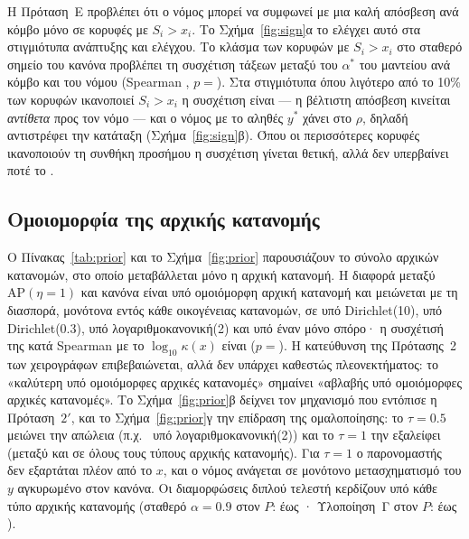 \documentclass[11pt,a4paper]{article}
\theoremstyle{definition}
\theoremstyle{plain}
\newcommand{\AP}{\mathrm{AP}}
\begin{document}
Η Πρόταση~E προβλέπει ότι ο νόμος μπορεί να συμφωνεί με μια καλή απόσβεση ανά κόμβο μόνο σε κορυφές με $S_i>x_i$. Το Σχήμα~\ref{fig:sign}α το ελέγχει αυτό στα \SignN{} στιγμιότυπα ανάπτυξης και ελέγχου. Το κλάσμα των κορυφών με $S_i>x_i$ στο σταθερό σημείο του κανόνα προβλέπει τη συσχέτιση τάξεων μεταξύ του $\alpha^*$ του μαντείου ανά κόμβο και του νόμου (Spearman \SignSpearman, $p={}$\SignSpearmanP{}). Στα \SignLowN{} στιγμιότυπα όπου λιγότερο από το 10\% των κορυφών ικανοποιεί $S_i>x_i$ η συσχέτιση είναι \SignLowCorr{} --- η βέλτιστη απόσβεση κινείται \emph{αντίθετα} προς τον νόμο --- και ο νόμος με το αληθές $y^*$ χάνει \SignLowDrop{} στο $\rho$, δηλαδή αντιστρέφει την κατάταξη (Σχήμα~\ref{fig:sign}β). Όπου οι περισσότερες κορυφές ικανοποιούν τη συνθήκη προσήμου η συσχέτιση γίνεται θετική, αλλά δεν υπερβαίνει ποτέ το \SignMaxCorr.

\subsection{Ομοιομορφία της αρχικής κατανομής}\label{sec:prior}

Ο Πίνακας~\ref{tab:prior} και το Σχήμα~\ref{fig:prior} παρουσιάζουν το σύνολο αρχικών κατανομών, στο οποίο μεταβάλλεται μόνο η αρχική κατανομή. Η διαφορά μεταξύ $\AP(\eta=1)$ και κανόνα είναι \PriorAPUnif{} υπό ομοιόμορφη αρχική κατανομή και μειώνεται με τη διασπορά, μονότονα εντός κάθε οικογένειας κατανομών, σε \PriorAPDirTen{} υπό Dirichlet(10), \PriorAPDirSmall{} υπό Dirichlet(0.3), \PriorAPLognTwo{} υπό λογαριθμοκανονική(2) και \PriorAPSeedOne{} υπό έναν μόνο σπόρο· η συσχέτισή της κατά Spearman με το $\log_{10}\kappa(x)$ είναι \PriorSpearman{} ($p={}$\PriorSpearmanP{}). Η κατεύθυνση της Πρότασης~2 των χειρογράφων επιβεβαιώνεται, αλλά δεν υπάρχει καθεστώς πλεονεκτήματος: το «καλύτερη υπό ομοιόμορφες αρχικές κατανομές» σημαίνει «αβλαβής υπό ομοιόμορφες αρχικές κατανομές». Το Σχήμα~\ref{fig:prior}β δείχνει τον μηχανισμό που εντόπισε η Πρόταση~$2'$, και το Σχήμα~\ref{fig:prior}γ την επίδραση της ομαλοποίησης: το $\tau=0.5$ μειώνει την απώλεια (π.χ.\ \PriorTauHalfLognTwo{} υπό λογαριθμοκανονική(2)) και το $\tau=1$ την εξαλείφει (μεταξύ \PriorTauOneMin{} και \PriorTauOneMax{} σε όλους τους τύπους αρχικής κατανομής). Για $\tau=1$ ο παρονομαστής δεν εξαρτάται πλέον από το $x$, και ο νόμος ανάγεται σε μονότονο μετασχηματισμό του $y$ αγκυρωμένο στον κανόνα. Οι διαμορφώσεις διπλού τελεστή κερδίζουν υπό κάθε τύπο αρχικής κατανομής (σταθερό $\alpha=0.9$ στον $P$: \PriorLinMin{} έως \PriorLinMax· Υλοποίηση~Γ στον $P$: \PriorPBXMin{} έως \PriorPBXMax).
\end{document}
